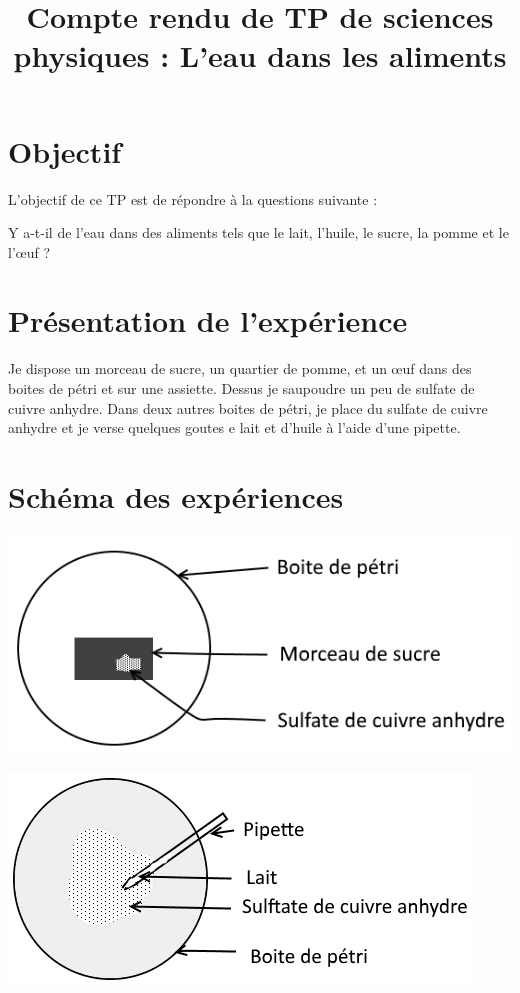 \documentclass[12pt,a4paper]{article}
\title{Compte rendu de TP de sciences physiques : L'eau dans les aliments}
\date{}
\begin{document}
	
\maketitle

\vspace*{-0.5cm}

\section{Objectif}	
	L'objectif de ce TP est de répondre à la questions suivante :
	
	Y a-t-il de l'eau dans des aliments tels que le lait, l'huile, le sucre, la pomme et le l'\oe uf ?




\section{Présentation de l'expérience}

Je dispose un morceau de sucre, un quartier de pomme, et un \oe uf dans des boites de pétri et sur une assiette. Dessus je saupoudre un peu de sulfate de cuivre anhydre. Dans deux autres boites de pétri, je place du sulfate de cuivre anhydre et je verse quelques goutes e lait et d'huile à l'aide d'une pipette.

\section{Schéma des expériences}

\begin{multicols}{2}
	\begin{center}
		\includegraphics[scale=0.5]{sucre}
	\end{center}

	\begin{center}
		\includegraphics[scale=0.5]{lait}
	\end{center}
\end{multicols}
\end{document}
